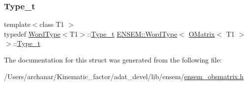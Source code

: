 \mbox{\label{structENSEM_1_1WordType_3_01OMatrix_3_01T1_01_4_01_4_a37e42971b324dfc3027d9f416e3d7d00}} 
\subsubsection{\texorpdfstring{Type\_t}{Type\_t}\hspace{0.1cm}{\footnotesize\ttfamily [2/2]}}
{\footnotesize\ttfamily template$<$class T1 $>$ \\
typedef \mbox{\hyperlink{structENSEM_1_1WordType}{Word\+Type}}$<$T1$>$\+::\mbox{\hyperlink{structENSEM_1_1WordType_3_01OMatrix_3_01T1_01_4_01_4_a37e42971b324dfc3027d9f416e3d7d00}{Type\+\_\+t}} \mbox{\hyperlink{structENSEM_1_1WordType}{E\+N\+S\+E\+M\+::\+Word\+Type}}$<$ \mbox{\hyperlink{classENSEM_1_1OMatrix}{O\+Matrix}}$<$ T1 $>$ $>$\+::\mbox{\hyperlink{structENSEM_1_1WordType_3_01OMatrix_3_01T1_01_4_01_4_a37e42971b324dfc3027d9f416e3d7d00}{Type\+\_\+t}}}



The documentation for this struct was generated from the following file\+:\begin{DoxyCompactItemize}
\item 
/\+Users/archanar/\+Kinematic\+\_\+factor/adat\+\_\+devel/lib/ensem/\mbox{\hyperlink{lib_2ensem_2ensem__obsmatrix_8h}{ensem\+\_\+obsmatrix.\+h}}\end{DoxyCompactItemize}
